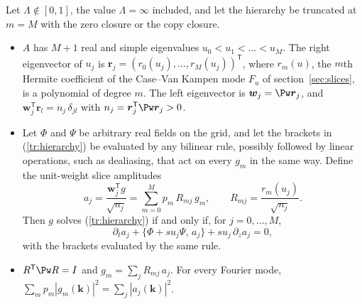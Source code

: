 \begin{theorem}\label{thm:trunc}
Let $\Lambda\notin[0,1]$, the value $\Lambda=\infty$ included, and let the hierarchy be truncated at $m=M$ with the zero closure or the copy closure.
\begin{itemize}
\item[(i)] $A$ has $M+1$ real and simple eigenvalues $u_0<u_1<\dots<u_M$. The right eigenvector of $u_j$ is $\boldsymbol r_j=(r_0(u_j),\dots,r_M(u_j))^{\mathsf T}$, where $r_m(u)$, the $m$th Hermite coefficient of the Case--Van Kampen mode $F_u$ of section~\ref{sec:slices}, is a polynomial of degree $m$. The left eigenvector is $\boldsymbol w_j=\Pw\boldsymbol r_j$, and $\boldsymbol w_j^{\mathsf T}\boldsymbol r_l=n_j\,\delta_{jl}$ with $n_j=\boldsymbol r_j^{\mathsf T}\Pw\boldsymbol r_j>0$.
\item[(ii)] Let $\Phi$ and $\Psi$ be arbitrary real fields on the grid, and let the brackets in (\ref{tr:hierarchy}) be evaluated by any bilinear rule, possibly followed by linear operations, such as dealiasing, that act on every $g_m$ in the same way. Define the unit-weight slice amplitudes
\begin{equation*}
  a_j=\frac{\boldsymbol w_j^{\mathsf T}g}{\sqrt{n_j}}=\sum_{m=0}^Mp_m\,R_{mj}\,g_m,\qquad R_{mj}=\frac{r_m(u_j)}{\sqrt{n_j}} .
\end{equation*}
Then $g$ solves (\ref{tr:hierarchy}) if and only if, for $j=0,\dots,M$,
\begin{equation}\label{eq:truncslice}
  \partial_ta_j+\{\Phi+su_j\Psi,\,a_j\}+su_j\,\partial_za_j=0,
\end{equation}
with the brackets evaluated by the same rule.
\item[(iii)] $R^{\mathsf T}\Pw R=I$ and $g_m=\sum_jR_{mj}\,a_j$. For every Fourier mode, $\sum_mp_m|g_m(\boldsymbol k)|^2=\sum_j|a_j(\boldsymbol k)|^2$.
\end{itemize}
\end{theorem}

